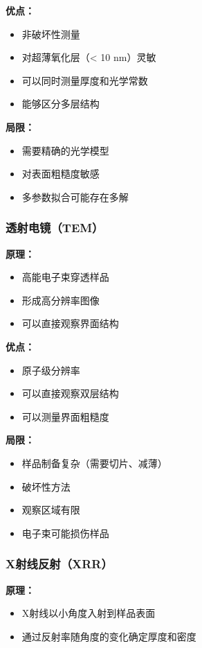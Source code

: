 \documentclass[UTF8,12pt,a4paper]{ctexart}
\begin{document}
\textbf{优点：}
\begin{itemize}
    \item 非破坏性测量
    \item 对超薄氧化层（< 10 nm）灵敏
    \item 可以同时测量厚度和光学常数
    \item 能够区分多层结构
\end{itemize}

\textbf{局限：}
\begin{itemize}
    \item 需要精确的光学模型
    \item 对表面粗糙度敏感
    \item 多参数拟合可能存在多解
\end{itemize}

\subsubsection{透射电镜（TEM）}

\textbf{原理：}
\begin{itemize}
    \item 高能电子束穿透样品
    \item 形成高分辨率图像
    \item 可以直接观察界面结构
\end{itemize}

\textbf{优点：}
\begin{itemize}
    \item 原子级分辨率
    \item 可以直接观察双层结构
    \item 可以测量界面粗糙度
\end{itemize}

\textbf{局限：}
\begin{itemize}
    \item 样品制备复杂（需要切片、减薄）
    \item 破坏性方法
    \item 观察区域有限
    \item 电子束可能损伤样品
\end{itemize}

\subsubsection{X射线反射（XRR）}

\textbf{原理：}
\begin{itemize}
    \item X射线以小角度入射到样品表面
    \item 通过反射率随角度的变化确定厚度和密度
\end{itemize}
\end{document}
